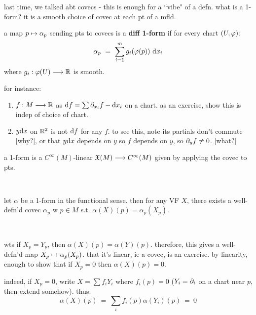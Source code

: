 last time, we talked abt covecs - this is enough for a ``vibe" of a defn.
what is a 1-form?
it is a smooth choice of covec at each pt of a mfld.

\begin{defn}[title=Coordinate-wise]
	a map $p\mapsto\alpha_{p}$ sending pts to covecs is a \textbf{diff 1-form} if
	for every chart $(U,\varphi)$:
	\begin{equation*}
		\alpha_{p} \ = \ \sum_{i=1}^{m}g_{i}(\varphi(p))\textrm{ d} x_{i}
	\end{equation*}
	where $g_{i}:\varphi(U)\longrightarrow\mathbb{R}$ is smooth.
\end{defn}

for instance:
\begin{enumerate}[1)]
	\item $f:M\longrightarrow\mathbb{R}$ as $\textrm{d} f = \sum\partial_{x_{i}}f-\textrm{d} x_{i}$ on a chart.
		as an exercise, show this is indep of choice of chart.
	\item $y\textrm{d} x$ on $\mathbb{R}^{2}$ is not $\textrm{d} f$ for any $f$.
		to see this, note its partials don't commute [why?], or that
		$y\textrm{d} x$ depends on $y$ so $f$ depends on $y$, so $\partial_{y}f\neq0$.
		[what?]
\end{enumerate}

\begin{defn}[title=Functional]
	a 1-form is a $C^{\infty}(M)$-linear $\mathfrak{X}(M)\longrightarrow C^{\infty}(M)$
	given by applying the covec to pts.
\end{defn} \

\begin{prop}
	let $\alpha$ be a 1-form in the functional sense.
	then for any VF $X$, there exists a well-defn'd covec $\alpha_{p}$ w $p\in M$ s.t.
	$\alpha(X)(p)=\alpha_{p}(X_{p})$.
\end{prop} \

\begin{pf}
	wts if $X_{p}=Y_{p}$, then $\alpha(X)(p)=\alpha(Y)(p)$.
	therefore, this gives a well-defn'd map $X_{p}\mapsto\alpha_{p}(X_{p})$.
	that it's linear, ie a covec, is an exercise.
	by linearity, enough to show that if $X_{p}=0$ then $\alpha(X)(p)=0$.

	indeed, if $X_{p}=0$, write $X=\sum f_{i}Y_{i}$ where $f_{i}(p)=0$
	($Y_{i}=\partial_{i}$ on a chart near $p$, then extend somehow).
	thus:
	\begin{equation*}
		\alpha(X)(p) \ = \ \sum_{i}f_{i}(p)\alpha(Y_{i})(p) \ = \ 0
	\end{equation*}
\end{pf} \

